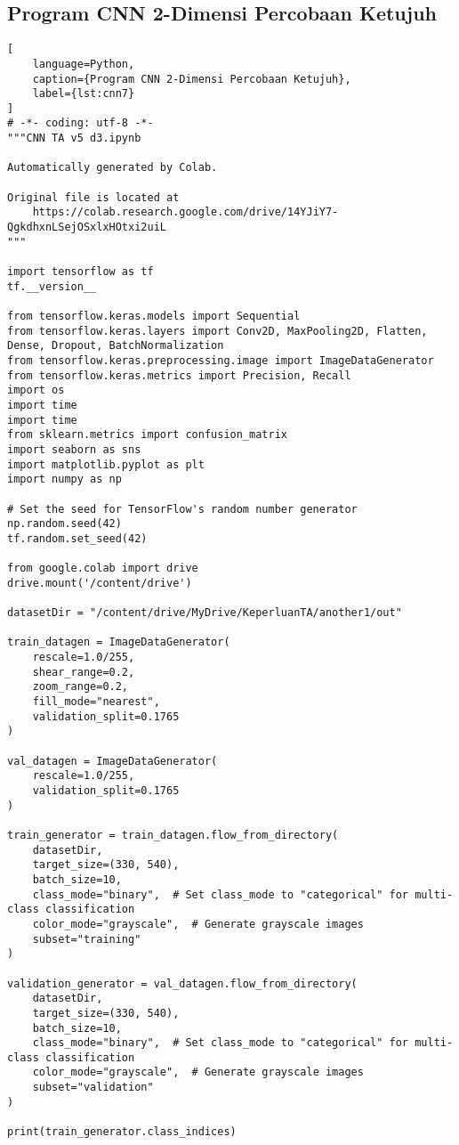 \subsection*{Program CNN 2-Dimensi Percobaan Ketujuh}
\begin{lstlisting}[
    language=Python,
    caption={Program CNN 2-Dimensi Percobaan Ketujuh},
    label={lst:cnn7}
]
# -*- coding: utf-8 -*-
"""CNN TA v5 d3.ipynb

Automatically generated by Colab.

Original file is located at
    https://colab.research.google.com/drive/14YJiY7-QgkdhxnLSejOSxlxHOtxi2uiL
"""

import tensorflow as tf
tf.__version__

from tensorflow.keras.models import Sequential
from tensorflow.keras.layers import Conv2D, MaxPooling2D, Flatten, Dense, Dropout, BatchNormalization
from tensorflow.keras.preprocessing.image import ImageDataGenerator
from tensorflow.keras.metrics import Precision, Recall
import os
import time
import time
from sklearn.metrics import confusion_matrix
import seaborn as sns
import matplotlib.pyplot as plt
import numpy as np

# Set the seed for TensorFlow's random number generator
np.random.seed(42)
tf.random.set_seed(42)

from google.colab import drive
drive.mount('/content/drive')

datasetDir = "/content/drive/MyDrive/KeperluanTA/another1/out"

train_datagen = ImageDataGenerator(
    rescale=1.0/255,
    shear_range=0.2,
    zoom_range=0.2,
    fill_mode="nearest",
    validation_split=0.1765
)

val_datagen = ImageDataGenerator(
    rescale=1.0/255,
    validation_split=0.1765
)

train_generator = train_datagen.flow_from_directory(
    datasetDir,
    target_size=(330, 540),
    batch_size=10,
    class_mode="binary",  # Set class_mode to "categorical" for multi-class classification
    color_mode="grayscale",  # Generate grayscale images
    subset="training"
)

validation_generator = val_datagen.flow_from_directory(
    datasetDir,
    target_size=(330, 540),
    batch_size=10,
    class_mode="binary",  # Set class_mode to "categorical" for multi-class classification
    color_mode="grayscale",  # Generate grayscale images
    subset="validation"
)

print(train_generator.class_indices)


\end{lstlisting}
